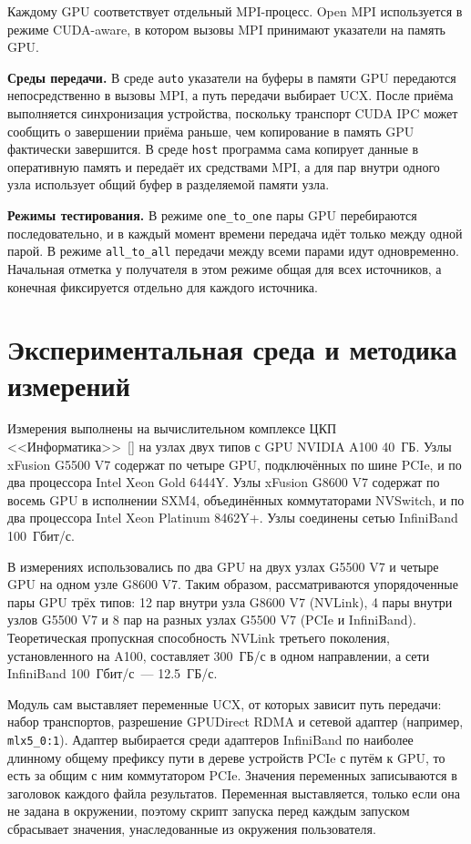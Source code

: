 Каждому GPU соответствует отдельный MPI-процесс. Open MPI используется в режиме CUDA-aware, в котором вызовы MPI принимают указатели на память GPU.

\textbf{Среды передачи.} В среде \texttt{auto} указатели на буферы в памяти GPU передаются непосредственно в вызовы MPI, а путь передачи выбирает UCX. После приёма выполняется синхронизация устройства, поскольку транспорт CUDA IPC может сообщить о завершении приёма раньше, чем копирование в память GPU фактически завершится. В среде \texttt{host} программа сама копирует данные в оперативную память и передаёт их средствами MPI, а для пар внутри одного узла использует общий буфер в разделяемой памяти узла.

\textbf{Режимы тестирования.} В режиме \texttt{one\_to\_one} пары GPU перебираются последовательно, и в каждый момент времени передача идёт только между одной парой. В режиме \texttt{all\_to\_all} передачи между всеми парами идут одновременно. Начальная отметка у получателя в этом режиме общая для всех источников, а конечная фиксируется отдельно для каждого источника.

\section{Экспериментальная среда и методика измерений}

Измерения выполнены на вычислительном комплексе ЦКП <<Информатика>>~[] на узлах двух типов с GPU NVIDIA A100 40~ГБ. Узлы xFusion G5500 V7 содержат по четыре GPU, подключённых по шине PCIe, и по два процессора Intel Xeon Gold 6444Y. Узлы xFusion G8600 V7 содержат по восемь GPU в исполнении SXM4, объединённых коммутаторами NVSwitch, и по два процессора Intel Xeon Platinum 8462Y+. Узлы соединены сетью InfiniBand 100~Гбит/с.

В измерениях использовались по два GPU на двух узлах G5500 V7 и четыре GPU на одном узле G8600 V7. Таким образом, рассматриваются упорядоченные пары GPU трёх типов: 12 пар внутри узла G8600 V7 (NVLink), 4 пары внутри узлов G5500 V7 и 8 пар на разных узлах G5500 V7 (PCIe и InfiniBand). Теоретическая пропускная способность NVLink третьего поколения, установленного на A100, составляет 300~ГБ/с в одном направлении, а сети InfiniBand 100~Гбит/с~--- 12.5~ГБ/с.

Модуль сам выставляет переменные UCX, от которых зависит путь передачи: набор транспортов, разрешение GPUDirect RDMA и сетевой адаптер (например, \texttt{mlx5\_0:1}). Адаптер выбирается среди адаптеров InfiniBand по наиболее длинному общему префиксу пути в дереве устройств PCIe с путём к GPU, то есть за общим с ним коммутатором PCIe. Значения переменных записываются в заголовок каждого файла результатов. Переменная выставляется, только если она не задана в окружении, поэтому скрипт запуска перед каждым запуском сбрасывает значения, унаследованные из окружения пользователя.

